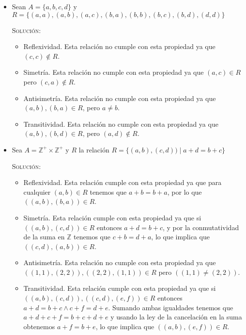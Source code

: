 \documentclass[letterpaper,11pt]{article}
\begin{document}
\begin{enumerate}
\begin{itemize}
        \item Sean $A = \{a,b,c,d\}$ y $R = \{(a,a), (a,b), (a,c), (b,a), (b,b),
        (b,c), (b,d), (d,d)\}$

        \textsc{Solución:}
        \begin{itemize}
            \item Reflexividad. Esta relación no cumple con esta propiedad ya
            que $(c, c) \not \in R$.

            \item Simetría. Esta relación no cumple con esta propiedad ya que 
            $(a, c) \in R$ pero $(c, a) \not \in R$.

            \item Antisimetría. Esta relación no cumple con esta propiedad ya
            que $(a, b), (b, a) \in R$, pero $a \not = b$.

            \item Transitividad. Esta relación no cumple con esta propiedad ya 
            que $(a, b), (b, d) \in R$, pero $(a, d) \not \in R$.
        \end{itemize}

        \item Sea $A = ℤ^{+} × ℤ^{+}$ y $R$ la relación $R = \{(a,b), (c,d)) \; 
        | \; a + d = b + c\}$

        \textsc{Solución:}
        \begin{itemize}
            \item Reflexividad. Esta relación cumple con esta propiedad ya que 
            para cualquier $(a, b) \in R$ tenemos que $a + b = b + a$, por lo 
            que $((a, b), (b, a)) \in R$.

            \item Simetría. Esta relación cumple con esta propiedad ya que 
            si $((a, b), (c, d)) \in R$ entonces $a + d = b + c$, y por la 
            conmutatividad de la suma en $ℤ$ tenemos que $c + b = d + a$, 
            lo que implica que $((c, d), (a, b)) \in R$. 

            \item Antisimetría. Esta relación no cumple con esta propiedad 
            ya que \\ $((1, 1), (2, 2)), ((2, 2), (1,1)) \in R$ pero 
            $((1,1) \not = (2,2))$.
            \item Transitividad. Esta relación cumple con esta propiedad ya que 
            si \\ $((a, b), (c, d)), ((c, d), (e, f)) \in R$ entonces 
            $a + d = b + c \land c + f = d + e$. Sumando ambas igualdades 
            tenemos que $a + d + c + f = b + c + d + e$ y usando la ley de la 
            cancelación en la suma obtenemos $a + f = b + e$, lo que implica 
            que $((a, b), (e, f)) \in R$. 
        \end{itemize}
    \end{itemize}


\end{enumerate}
\end{document}
